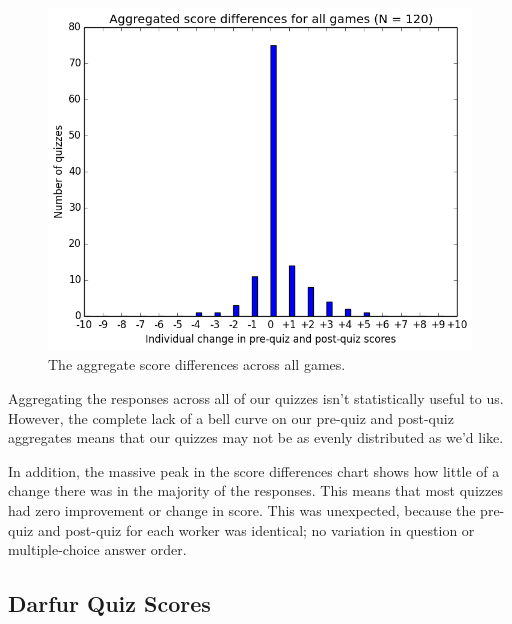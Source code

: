 			\begin{figure}[] 
			\centering 
			\includegraphics[width=\textwidth]{general_results.png} 
			\caption{The aggregate score differences across all games.}
			\end{figure}

			Aggregating the responses across all of our quizzes isn't statistically useful to us. However, the complete lack of a bell curve on our pre-quiz and post-quiz aggregates means that our quizzes may not be as evenly distributed as we'd like.

			In addition, the massive peak in the score differences chart shows how little of a change there was in the majority of the responses. This means that most quizzes had zero improvement or change in score. This was unexpected, because the pre-quiz and post-quiz for each worker was identical; no variation in question or multiple-choice answer order.

			\clearpage

		\subsection{Darfur Quiz Scores}

